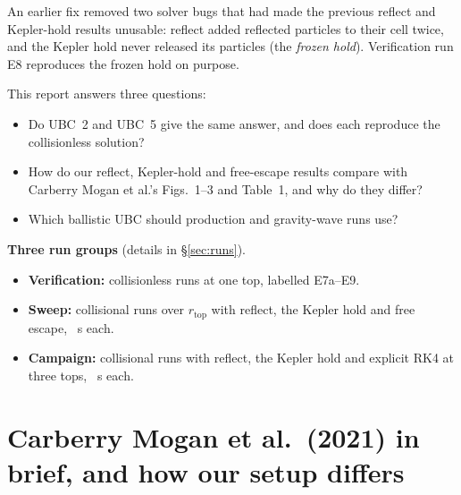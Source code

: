 \documentclass[10pt]{article}
\newcommand{\para}[1]{\textbf{#1}\hspace{0.5em}}
\newcommand{\rtop}{r_\mathrm{top}}
\begin{document}
An earlier fix removed two solver bugs that had made the previous reflect and Kepler-hold results unusable: reflect added reflected particles to their cell twice, and the Kepler hold never released its particles (the \emph{frozen hold}). Verification run E8 reproduces the frozen hold on purpose.

This report answers three questions:
\begin{itemize}
  \item Do UBC~2 and UBC~5 give the same answer, and does each reproduce the collisionless solution?
  \item How do our reflect, Kepler-hold and free-escape results compare with Carberry Mogan et al.'s Figs.~1–3 and Table~1, and why do they differ?
  \item Which ballistic UBC should production and gravity-wave runs use?
\end{itemize}

\para{Three run groups} (details in \S\ref{sec:runs}).
\begin{itemize}
  \item \textbf{Verification:} \verNHoldRuns{} collisionless runs at one top, labelled E7a–E9.
  \item \textbf{Sweep:} \nSweepTotal{} collisional runs over $\rtop$ with reflect, the Kepler hold and free escape, \sweepTend{}~s each.
  \item \textbf{Campaign:} \campNtotal{} collisional runs with reflect, the Kepler hold and explicit RK4 at three tops, \campTend{}~s each.
\end{itemize}

\section{Carberry Mogan et al.\ (2021) in brief, and how our setup differs}\label{sec:paper}
\end{document}
